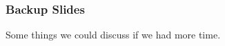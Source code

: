 \documentclass[main]{subfiles}
\begin{document}
\begin{frame}
\frametitle{Backup Slides}
Some things we could discuss if we had more time.
\end{frame}

\begin{comment}
\begin{frame}

  \frametitle{Contents}
  \tableofcontents[currentsection]
\end{frame}


\section{Something}

\frame{

  \frametitle{Evolving Virtual Creatures}
  
  \begin{columns}
   \column{0.3\textwidth}
 \begin{itemize}
	     \item a
    	\item b
    	\item c
     \end{itemize}
     
     \column{0.6\textwidth}
  \end{columns}
  }
\note{}

\begin{frame}
\textbf{New colors and their names\\}
Here we show the different colors you can use. From left to right, this are the colors ETH1, ETH2, \ldots , ETH9.


\end{comment}
\end{document}
